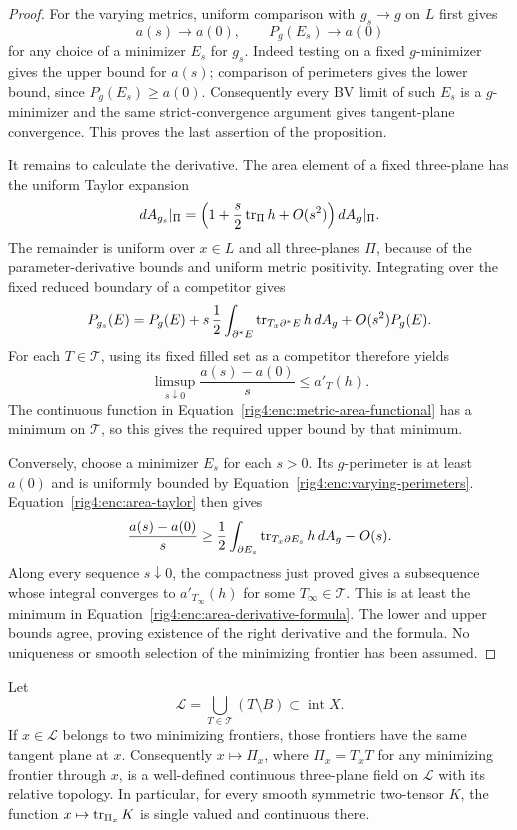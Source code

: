 \begin{proof}
For the varying metrics, uniform comparison with $g_s\to g$ on $L$
first gives
\begin{equation}
 a(s)\longrightarrow a(0),\qquad
 P_g(E_s)\longrightarrow a(0)
 \label{rig4:enc:varying-perimeters}
\end{equation}
for any choice of a minimizer $E_s$ for $g_s$. Indeed testing on a
fixed $g$-minimizer gives the upper bound for $a(s)$; comparison of
perimeters gives the lower bound, since $P_g(E_s)\ge a(0)$.
Consequently every BV limit of such $E_s$ is a $g$-minimizer and the
same strict-convergence argument gives tangent-plane convergence.
This proves the last assertion of the proposition.

It remains to calculate the derivative. The area element of a fixed
three-plane has the uniform Taylor expansion
\begin{equation}
 dA_{g_s}|_\Pi
 =\left(1+\frac{s}{2}\operatorname{tr}_\Pi h+O(s^2)\right)dA_g|_\Pi.
 \label{rig4:enc:area-taylor}
\end{equation}
The remainder is uniform over $x\in L$ and all three-planes $\Pi$,
because of the parameter-derivative bounds and uniform metric
positivity. Integrating over the fixed reduced boundary of a
competitor gives
\[
 P_{g_s}(E)=P_g(E)+s\,\frac12
       \int_{\partial^*E}\operatorname{tr}_{T_x\partial^*E}h\,dA_g
       +O(s^2)P_g(E).
\]
For each $T\in\mathcal T$, using its fixed filled set as a competitor
therefore yields
\[
 \limsup_{s\downarrow0}\frac{a(s)-a(0)}s
 \le a'_T(h).
\]
The continuous function in Equation~\eqref{rig4:enc:metric-area-functional}
has a minimum on $\mathcal T$, so this gives the required upper bound
by that minimum.

Conversely, choose a minimizer $E_s$ for each $s>0$. Its
$g$-perimeter is at least $a(0)$ and is uniformly bounded by
Equation~\eqref{rig4:enc:varying-perimeters}. Equation~\eqref{rig4:enc:area-taylor}
then gives
\[
 \frac{a(s)-a(0)}s
 \ge\frac12\int_{\partial E_s}
       \operatorname{tr}_{T_x\partial E_s}h\,dA_g-O(s).
\]
Along every sequence $s\downarrow0$, the compactness just proved gives
a subsequence whose integral converges to $a'_{T_\infty}(h)$ for some
$T_\infty\in\mathcal T$. This is at least the minimum in
Equation~\eqref{rig4:enc:area-derivative-formula}. The lower and upper
bounds agree, proving existence of the right derivative and the
formula. No uniqueness or smooth selection of the minimizing
frontier has been assumed.
\end{proof}

\begin{proposition}
\label{rig4:enc:common-plane}
Let
\[
 \mathcal L=\bigcup_{T\in\mathcal T}(T\setminus B)
 \subset\operatorname{int}X.
\]
If $x\in\mathcal L$ belongs to two minimizing frontiers, those frontiers have the
same tangent plane at $x$. Consequently $x\mapsto\Pi_x$, where
$\Pi_x=T_xT$ for any minimizing frontier through $x$, is a well-defined
continuous three-plane field on $\mathcal L$ with its relative
topology. In particular, for every smooth symmetric two-tensor $K$,
the function $x\mapsto\operatorname{tr}_{\Pi_x}K$ is single valued and continuous
there.
\end{proposition}

